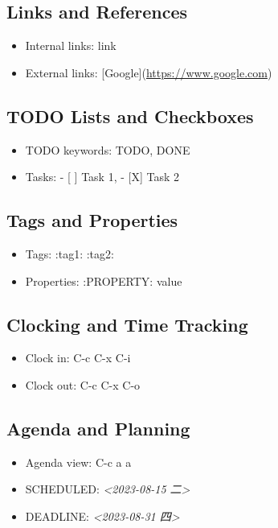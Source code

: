 \documentclass[11pt]{article}
\begin{document}
\subsection{Links and References}
\label{sec:orgaab3ae6}
\begin{itemize}
\item Internal links: link
\item External links: [Google](\url{https://www.google.com})
\end{itemize}

\subsection{{\bfseries\sffamily TODO} Lists and Checkboxes}
\label{sec:org301e6fe}
\begin{itemize}
\item TODO keywords: TODO, DONE
\item Tasks: - [ ] Task 1, - [X] Task 2
\end{itemize}

\subsection{Tags and Properties}
\label{sec:orge7a0236}
\begin{itemize}
\item Tags: :tag1: :tag2:
\item Properties: :PROPERTY: value
\end{itemize}

\subsection{Clocking and Time Tracking}
\label{sec:orgc89dad5}
\begin{itemize}
\item Clock in: C-c C-x C-i
\item Clock out: C-c C-x C-o
\end{itemize}

\subsection{Agenda and Planning}
\label{sec:org7e87a33}
\begin{itemize}
\item Agenda view: C-c a a
\item SCHEDULED: \textit{<2023-08-15 二>}
\item DEADLINE: \textit{<2023-08-31 四>}
\end{itemize}
\end{document}
